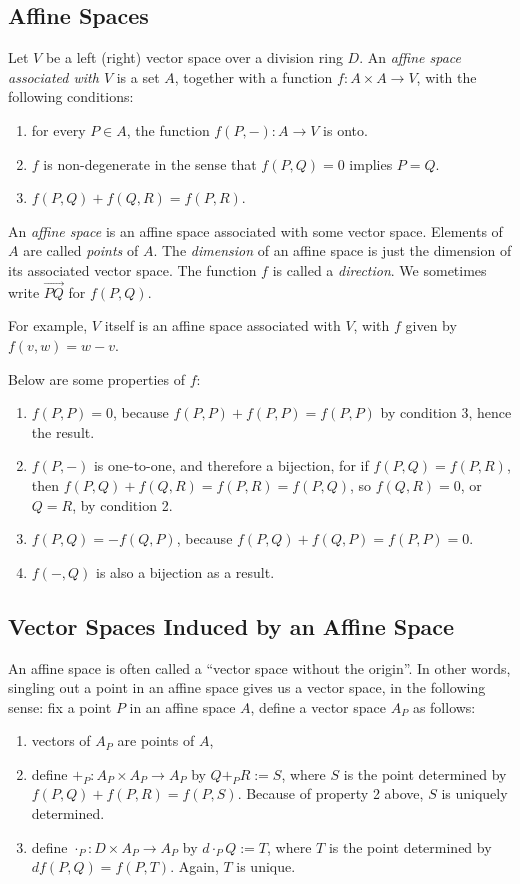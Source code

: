 \documentclass[12pt]{article}
\begin{document}
\subsection*{Affine Spaces}
Let $V$ be a left (right) vector space over a division ring $D$.  An \emph{affine space associated with $V$} is a set $A$, together with a function $f: A\times A\to V$, with the following conditions:
\begin{enumerate}
\item for every $P\in A$, the function $f(P,-):A\to V$ is onto.
\item $f$ is non-degenerate in the sense that $f(P,Q)=0$ implies $P=Q$.
\item $f(P,Q)+f(Q,R)=f(P,R)$.
\end{enumerate}
An \emph{affine space} is an affine space associated with some vector space.  Elements of $A$ are called \emph{points} of $A$.  The \emph{dimension} of an affine space is just the dimension of its associated vector space.  The function $f$ is called a \emph{direction}.  We sometimes write $\stackrel{\longrightarrow}{PQ}$ for $f(P,Q)$.

For example, $V$ itself is an affine space associated with $V$, with $f$ given by $f(v,w)=w-v$.

Below are some properties of $f$:
\begin{enumerate}
\item $f(P,P)=0$, because $f(P,P)+f(P,P)=f(P,P)$ by condition 3, hence the result.
\item $f(P,-)$ is one-to-one, and therefore a bijection, for if $f(P,Q)=f(P,R)$, then $f(P,Q)+f(Q,R)=f(P,R)=f(P,Q)$, so $f(Q,R)=0$, or $Q=R$, by condition 2.
\item $f(P,Q)=-f(Q,P)$, because $f(P,Q)+f(Q,P)=f(P,P)=0$.
\item $f(-,Q)$ is also a bijection as a result.
\end{enumerate}

\subsection*{Vector Spaces Induced by an Affine Space}

An affine space is often called a ``vector space without the origin''.  In other words, singling out a point in an affine space gives us a vector space, in the following sense: fix a point $P$ in an affine space $A$, define a vector space $A_P$ as follows: 
\begin{enumerate}
\item vectors of $A_P$ are points of $A$,
\item define $+_P:A_P\times A_P \to A_P$ by $Q +_P R:=S$, where $S$ is the point determined by $f(P,Q)+f(P,R)=f(P,S)$.  Because of property 2 above, $S$ is uniquely determined.
\item define $\cdot_P: D\times A_P \to A_P$ by $d \cdot_P Q:=T$, where $T$ is the point determined by $df(P,Q)=f(P,T)$.  Again, $T$ is unique.
\end{enumerate}
\end{document}
